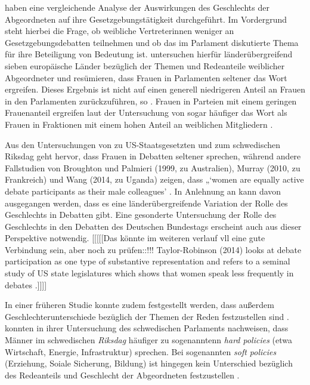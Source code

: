 \documentclass[12pt, 
    twoside=false, 
    bibliography=totoc, 
    numbers=endperiod, 
    headings=normal, 
    toc=chapterentrydotfill
    ]{scrbook}
\begin{document}
\textcite{back_2018} haben eine vergleichende Analyse der Auswirkungen des Geschlechts der Abgeordneten auf ihre Gesetzgebungstätigkeit durchgeführt. Im Vordergrund steht hierbei die Frage, ob weibliche Vertreterinnen weniger an Gesetzgebungsdebatten teilnehmen und ob das im Parlament diskutierte Thema für ihre Beteiligung von Bedeutung ist. \textcite{back_2018} untersuchen hierfür länderübergreifend sieben europäische Länder bezüglich der Themen und Redeanteile weiblicher Abgeordneter und resümieren, dass Frauen in Parlamenten seltener das Wort ergreifen. Dieses Ergebnis ist nicht auf einen generell niedrigeren Anteil an Frauen in den Parlamenten zurückzuführen, so \textcite{back_2018}. Frauen in Parteien mit einem geringen Frauenanteil ergreifen laut der Untersuchung von \textcite{back_2018} sogar häufiger das Wort als Frauen in Fraktionen mit einem hohen Anteil an weiblichen Mitgliedern \parencite*[17]{back_2018}. 

Aus den Untersuchungen von \textcite{kathlene_1994} zu US-Staatsgesetzten und \textcite{back_2014} zum schwedischen Riksdag geht hervor, dass Frauen in Debatten seltener sprechen, während andere Fallstudien von \textcite{noch eingeben}Broughton und Palmieri (1999, zu Australien),\textcite{noch eingeben} Murray (2010, zu Frankreich) und Wang\textcite{noch eingeben} (2014, zu Uganda) zeigen, dass „‘women are equally active debate participants as their male colleagues’ \parencites[254]{taylor-robinson_2014}[2]{back_2018}. In Anlehnung an \textcite{back_2018} kann davon ausgegangen werden, dass es eine länderübergreifende Variation der Rolle des Geschlechts in Debatten gibt\parencite[2]{back_2018}. Eine gesonderte Untersuchung der Rolle des Geschlechts in den Debatten des Deutschen Bundestags erscheint auch aus dieser Perspektive notwendig. 
[[[[[Das könnte im weiteren verlauf vll eine gute Verbindung sein, aber noch zu prüfen::!!! Taylor-Robinson (2014) looks at debate participation as one type of substantive representation and refers to a seminal study of US state legislatures which shows that women speak less frequently in debates \parencite{kathlene_1994}.]]]]


In einer früheren Studie konnte zudem festgestellt werden, dass außerdem Geschlechterunterschiede bezüglich der Themen der Reden festzustellen sind \parencite[514f.]{back_2014}. \textcite{back_2014} konnten in ihrer Untersuchung des schwedischen Parlaments nachweisen, dass Männer im schwedischen \emph{Riksdag} häufiger zu sogenanntenn \emph{hard policies} (etwa Wirtschaft, Energie, Infrastruktur) sprechen. Bei sogenannten \emph{soft policies} (Erziehung, Soiale Sicherung, Bildung) ist hingegen kein Unterschied bezüglich des Redeanteils und Geschlecht der Abgeordneten festzustellen \parencite[514f.]{back_2014}. 
\end{document}
